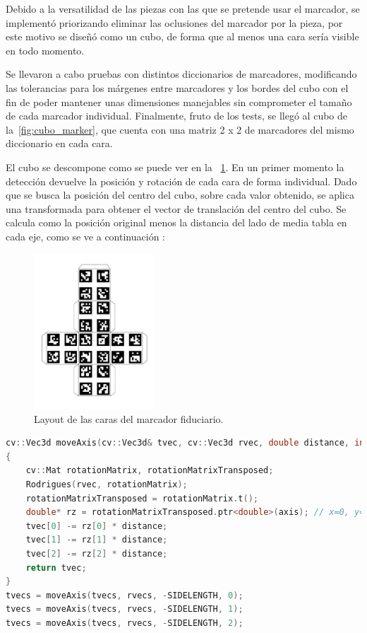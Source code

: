 Debido a la versatilidad de las piezas con las que se pretende usar el marcador, se implementó priorizando eliminar las oclusiones del marcador por la pieza, por este motivo se diseñó como un cubo, de forma que al menos una cara sería visible en todo momento. 

Se llevaron a cabo pruebas con distintos diccionarios de marcadores, modificando las tolerancias para los márgenes entre marcadores y los bordes del cubo con el fin de poder mantener unas dimensiones manejables sin comprometer el tamaño de cada marcador individual.
Finalmente, fruto de los tests, se llegó al cubo de la\figurename~\ref{fig:cubo_marker}, que cuenta con una matriz 2 x 2 de marcadores del mismo diccionario en cada cara.

El cubo se descompone como se puede ver en la \figurename~\ref{fig:cube_layout}. En un primer momento la detección devuelve la posición y rotación de cada cara de forma individual. Dado que se busca la posición del centro del cubo, sobre cada valor obtenido, se aplica una transformada para obtener el vector de translación del centro del cubo. Se calcula como la posición original menos la distancia del lado de media tabla  en cada eje, como se ve a continuación :

\begin{figure}
  \centering
  \includegraphics[width=0.4\textwidth]{imaxes/cube_layout.png}
  \caption{Layout de las caras del marcador fiduciario.}
  \label{fig:cube_layout}
\end{figure}

\begin{lstlisting}[language=C++]
cv::Vec3d moveAxis(cv::Vec3d& tvec, cv::Vec3d rvec, double distance, int axis)
{
    cv::Mat rotationMatrix, rotationMatrixTransposed;
    Rodrigues(rvec, rotationMatrix);
    rotationMatrixTransposed = rotationMatrix.t();
    double* rz = rotationMatrixTransposed.ptr<double>(axis); // x=0, y=1, z=2
    tvec[0] -= rz[0] * distance;
    tvec[1] -= rz[1] * distance;
    tvec[2] -= rz[2] * distance;
    return tvec;
}
tvecs = moveAxis(tvecs, rvecs, -SIDELENGTH, 0);
tvecs = moveAxis(tvecs, rvecs, -SIDELENGTH, 1);
tvecs = moveAxis(tvecs, rvecs, -SIDELENGTH, 2);

\end{lstlisting}

